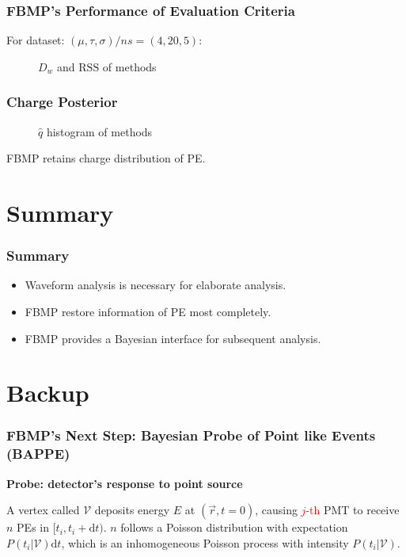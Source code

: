 \documentclass{beamer}
\newcommand{\dd}{\mathrm{d}}
\begin{document}
\begin{CJK*}{UTF8}{gbsn}
\begin{frame}
\frametitle{FBMP's Performance of Evaluation Criteria}
For dataset: $(\mu, \tau, \sigma)/\si{ns}=(4, 20, 5)$: 
\begin{figure}
    \centering
    \resizebox{\textwidth}{!}{}
    \caption{$D_w$ and $\mathrm{RSS}$ of methods}
\end{figure}
\end{frame}

\begin{frame}
\frametitle{Charge Posterior}
\begin{figure}
    \centering
    \resizebox{0.7\textwidth}{!}{}
    \caption{$\hat{q}$ histogram of methods}
\end{figure}
\begin{block}{}
FBMP retains charge distribution of PE. 
\end{block}
\end{frame}

\section{Summary}

\begin{frame}
\frametitle{Summary}
\begin{itemize}
    \item Waveform analysis is necessary for elaborate analysis. 
    \item FBMP restore information of PE most completely. 
    \item FBMP provides a Bayesian interface for subsequent analysis. 
\end{itemize}
\end{frame}

\section{Backup}
\label{sec:FBMP's Next Step: Bayesian Probe of Point like Events (BAPPE)}

\begin{frame}
    \frametitle{FBMP's Next Step: Bayesian Probe of Point like Events (BAPPE)}
    \textbf{Probe: detector's response to point source}
    
    A vertex called $\mathcal{V}$ deposits energy $E$ at $(\vec{r},t=0)$, causing \textcolor{red}{$j$-th} PMT to receive $n$ PEs in $[t_i, t_i+\dd t)$. $n$ follows a Poisson distribution with expectation $P(t_i|\mathcal{V})\dd t$, which is an inhomogeneous Poisson process with intensity $P(t_i|\mathcal{V})$.
    

\end{frame}
\end{CJK*}
\end{document}
